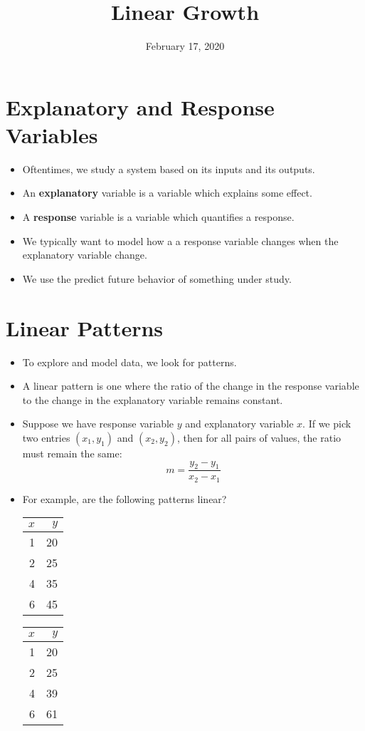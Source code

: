 \documentclass{article}
\title{Linear Growth}
\date{February 17, 2020}
\begin{document}
\maketitle
\section*{Explanatory and Response Variables}
\begin{itemize}
	\item Oftentimes, we study a system based on its inputs and its outputs.
	\item An {\bf explanatory} variable is a variable which explains some effect.
	\item A {\bf response} variable is a variable which quantifies a response.
	\item We typically want to model how a a response variable changes when the explanatory variable change.
	\item We use the predict future behavior of something under study.
\end{itemize}

\section*{Linear Patterns}
\begin{itemize}
	\item To explore and model data, we look for patterns.
	\item A linear pattern is one where the ratio of the change in the response variable to the change in the explanatory variable remains constant.
	\item Suppose we have response variable $y$ and explanatory variable $x$.  If we pick 
	two entries $(x_1, y_1)$ and $(x_2, y_2)$, then for all pairs of values, the ratio must remain the same:
	\[
	m = \dfrac{y_2 - y_1}{x_2-x_1}
	\]
	\item For example, are the following patterns linear?\newline
	\begin{tabular}{|r|r|}
		\hline
		$x$ & $y$ \\
		\hline
		1 & 20\\
		2 & 25\\
		4 & 35\\
		6 & 45\\
		\hline
	\end{tabular}
	\begin{tabular}{|r|r|}
		\hline
		$x$ & $y$ \\
		\hline
		1 & 20\\
		2 & 25\\
		4 & 39\\
		6 & 61\\
		\hline
	\end{tabular}
\end{itemize}
\end{document}
